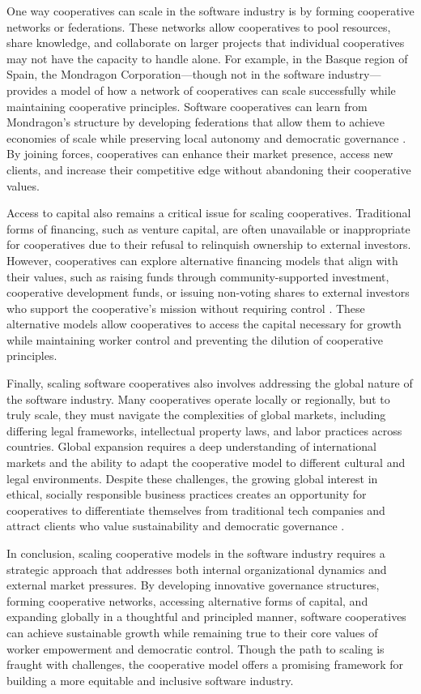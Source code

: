 \begin{refsection}
One way cooperatives can scale in the software industry is by forming cooperative networks or federations. These networks allow cooperatives to pool resources, share knowledge, and collaborate on larger projects that individual cooperatives may not have the capacity to handle alone. For example, in the Basque region of Spain, the Mondragon Corporation—though not in the software industry—provides a model of how a network of cooperatives can scale successfully while maintaining cooperative principles. Software cooperatives can learn from Mondragon's structure by developing federations that allow them to achieve economies of scale while preserving local autonomy and democratic governance \cite[pp.~57-60]{whyte1991}. By joining forces, cooperatives can enhance their market presence, access new clients, and increase their competitive edge without abandoning their cooperative values.

Access to capital also remains a critical issue for scaling cooperatives. Traditional forms of financing, such as venture capital, are often unavailable or inappropriate for cooperatives due to their refusal to relinquish ownership to external investors. However, cooperatives can explore alternative financing models that align with their values, such as raising funds through community-supported investment, cooperative development funds, or issuing non-voting shares to external investors who support the cooperative’s mission without requiring control \cite[pp.~102-104]{wright2010}. These alternative models allow cooperatives to access the capital necessary for growth while maintaining worker control and preventing the dilution of cooperative principles.

Finally, scaling software cooperatives also involves addressing the global nature of the software industry. Many cooperatives operate locally or regionally, but to truly scale, they must navigate the complexities of global markets, including differing legal frameworks, intellectual property laws, and labor practices across countries. Global expansion requires a deep understanding of international markets and the ability to adapt the cooperative model to different cultural and legal environments. Despite these challenges, the growing global interest in ethical, socially responsible business practices creates an opportunity for cooperatives to differentiate themselves from traditional tech companies and attract clients who value sustainability and democratic governance \cite[pp.~64-66]{kelly2012}.

In conclusion, scaling cooperative models in the software industry requires a strategic approach that addresses both internal organizational dynamics and external market pressures. By developing innovative governance structures, forming cooperative networks, accessing alternative forms of capital, and expanding globally in a thoughtful and principled manner, software cooperatives can achieve sustainable growth while remaining true to their core values of worker empowerment and democratic control. Though the path to scaling is fraught with challenges, the cooperative model offers a promising framework for building a more equitable and inclusive software industry.


\end{refsection}
